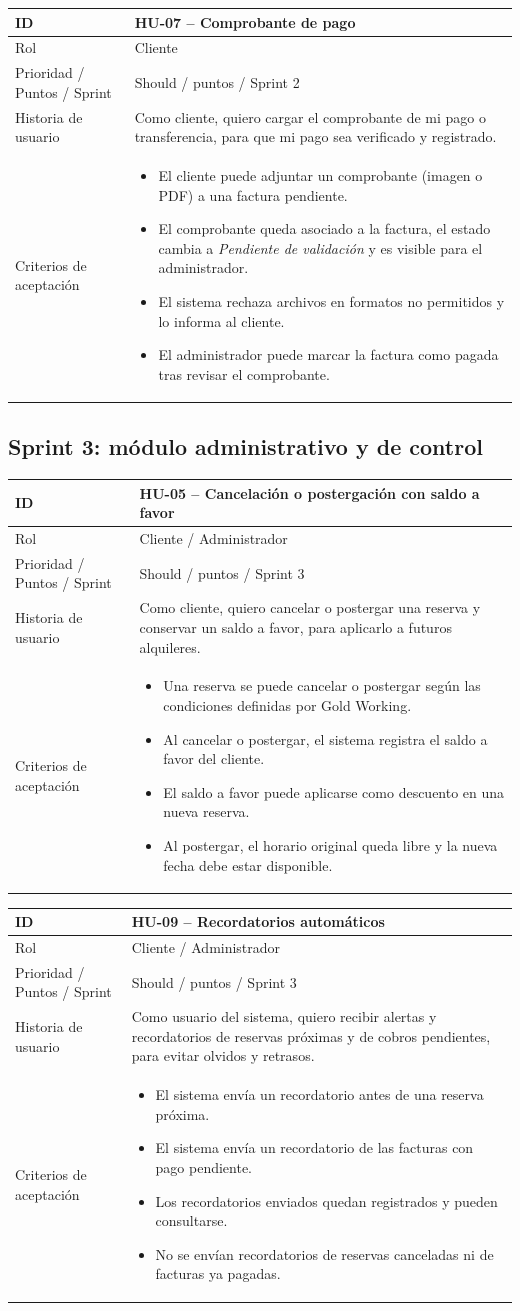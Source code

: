 \documentclass[12pt,a4paper]{article}
\newcommand{\hu}[8]{%
  \noindent\begin{tabular}{|p{3.1cm}|p{11.9cm}|}
  \hline
  \rowcolor{gray!20}\textbf{ID} & \textbf{#1 -- #2} \\ \hline
  Rol & #3 \\ \hline
  Prioridad / Puntos / Sprint & #4 \;/\; #5 puntos \;/\; #6 \\ \hline
  Historia de usuario & #7 \\ \hline
  Criterios de aceptaci\'on &
    \vspace{-0.9em}\begin{itemize}[leftmargin=1.2em,nosep]#8\end{itemize}\vspace{-0.6em} \\ \hline
  \end{tabular}\par\medskip}
\begin{document}
\hu{HU-07}{Comprobante de pago}{Cliente}{Should}{3}{Sprint 2}
{Como cliente, quiero cargar el comprobante de mi pago o transferencia, para que mi pago sea verificado y registrado.}
{\item El cliente puede adjuntar un comprobante (imagen o PDF) a una factura pendiente.
 \item El comprobante queda asociado a la factura, el estado cambia a \emph{Pendiente de validaci\'on} y es visible para el administrador.
 \item El sistema rechaza archivos en formatos no permitidos y lo informa al cliente.
 \item El administrador puede marcar la factura como pagada tras revisar el comprobante.}

\subsection*{Sprint 3: m\'odulo administrativo y de control}

\hu{HU-05}{Cancelaci\'on o postergaci\'on con saldo a favor}{Cliente / Administrador}{Should}{8}{Sprint 3}
{Como cliente, quiero cancelar o postergar una reserva y conservar un saldo a favor, para aplicarlo a futuros alquileres.}
{\item Una reserva se puede cancelar o postergar seg\'un las condiciones definidas por Gold Working.
 \item Al cancelar o postergar, el sistema registra el saldo a favor del cliente.
 \item El saldo a favor puede aplicarse como descuento en una nueva reserva.
 \item Al postergar, el horario original queda libre y la nueva fecha debe estar disponible.}

\hu{HU-09}{Recordatorios autom\'aticos}{Cliente / Administrador}{Should}{3}{Sprint 3}
{Como usuario del sistema, quiero recibir alertas y recordatorios de reservas pr\'oximas y de cobros pendientes, para evitar olvidos y retrasos.}
{\item El sistema env\'ia un recordatorio antes de una reserva pr\'oxima.
 \item El sistema env\'ia un recordatorio de las facturas con pago pendiente.
 \item Los recordatorios enviados quedan registrados y pueden consultarse.
 \item No se env\'ian recordatorios de reservas canceladas ni de facturas ya pagadas.}
\end{document}
